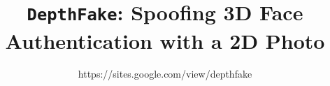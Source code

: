 \documentclass[conference,compsoc]{IEEEtran}
\begin{document}
	\pagestyle{plain}

\title{ \Large \bf \texttt{DepthFake}: Spoofing 3D Face Authentication with a 2D Photo
\\
}

\author{https://sites.google.com/view/depthfake}

\maketitle







% 










%
\end{document}

